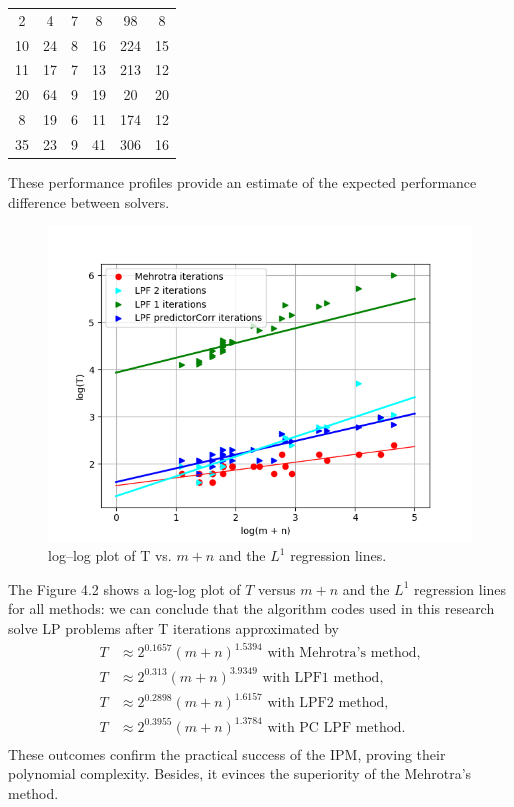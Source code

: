 \documentclass[a4paper,10 pt,titlepage,twoside]{report}
\theoremstyle{plain}
\theoremstyle{definition}
\theoremstyle{remark}
\begin{document}
{{\begin{table}
\begin{center}
\begin{tabular}{cccccc}
		2 & 4 & 7 & 8 & 98 & 8 \\
		10 & 24 & 8 & 16 & 224 & 15 \\
		11 & 17 & 7 & 13 & 213 & 12 \\
		20 & 64 & 9 & 19 & 20 & 20 \\
		8 & 19 & 6 & 11 & 174 & 12 \\
		35 & 23 & 9 & 41 & 306 & 16 \\ \hline
	\end{tabular}
\end{center}
\end{table}
These performance profiles provide an estimate of the expected performance difference
between solvers.
\begin{figure}\label{figure:T}
	\begin{center}
		\includegraphics[width= 15 cm]{numberiterations}\caption{log–log plot of T vs. $m + n$ and the $L^{1}$ regression lines.}
	\end{center}
\end{figure}
The Figure 4.2 shows a log-log plot of $T$ versus $m + n$ and the $L^{1}$ regression lines for all methods: we can conclude that the algorithm codes used in this research solve LP problems after T iterations approximated by
\begin{align*}
T& \approx 2^{0.1657}(m + n)^{1.5394} \text{ with Mehrotra's method,}\\
T &\approx 2^{0.313}(m + n)^{3.9349} \text{ with LPF1 method,}\\
T& \approx 2^{0.2898}(m + n)^{1.6157} \text{ with LPF2 method,}\\
T& \approx 2^{0.3955}(m + n)^{1.3784} \text{ with PC LPF method.}\\
\end{align*}
These outcomes confirm the practical success of the IPM, proving their polynomial complexity. Besides, it evinces the superiority of the Mehrotra's method. 
%

}}
\end{document}
